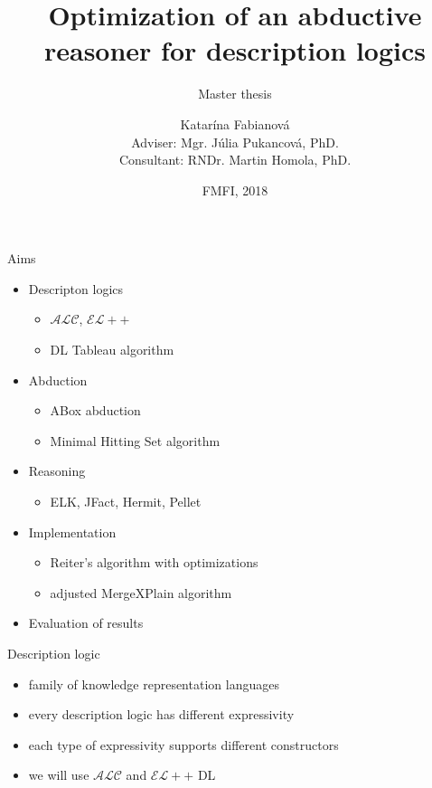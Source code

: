 \documentclass{beamer}
\title{Optimization of an abductive reasoner for description logics}
\subtitle{Master thesis}
\author{Katarína Fabianová \\ Adviser: Mgr. Júlia Pukancová, PhD. \\ Consultant:  RNDr. Martin Homola, PhD.}
\date{FMFI, 2018}
\begin{document}
\begin{frame}
  \titlepage
\end{frame}



\begin{frame}{Aims}
	\begin{itemize}		
		\item {
			Descripton logics
			\begin{itemize}
				\item $\mathcal{ALC}$, $\mathcal{EL{+}{+}}$
				\item DL Tableau algorithm
			\end{itemize}
		}
				
		\item {
			Abduction
			\begin{itemize}
				\item ABox abduction
				\item Minimal Hitting Set algorithm
			\end{itemize}
		}

		\item {
			Reasoning
			\begin{itemize}
				\item ELK, JFact, Hermit, Pellet
			\end{itemize}
		}
												
		\item {
			Implementation
			\begin{itemize}
				\item Reiter's algorithm with optimizations
				\item adjusted MergeXPlain algorithm
			\end{itemize}
		}

		\item {
			Evaluation of results
		}		
	\end{itemize}
\end{frame}


\begin{frame}{Description logic}
  \begin{itemize}
	\item {
		family of knowledge representation languages
	}
	
	\item {
		every description logic has different expressivity
	}
	
	\item {
		each type of expressivity supports different constructors
	}
	
	\item {
		we will use $\mathcal{ALC}$ and $\mathcal{EL{+}{+}}$ DL
	}

  \end{itemize}
\end{frame}
\end{document}
